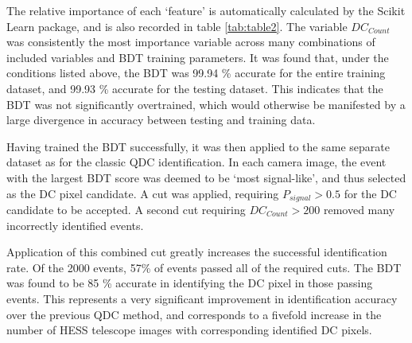 \documentclass[]{article}
\begin{document}
The relative importance of each \textquoteleft feature' is automatically calculated by the Scikit Learn package, and is also recorded in table \ref{tab:table2}. The variable $DC_{Count}$ was consistently the most importance variable across many combinations of included variables and BDT training parameters. It was found that, under the conditions listed above, the BDT was 99.94 \% accurate for the entire training dataset, and 99.93 \%  accurate for the testing dataset. This indicates that the BDT was not significantly overtrained, which would otherwise be manifested by a large divergence in accuracy between testing and training data.

Having trained the BDT successfully, it was then applied to the same separate dataset as for the classic QDC identification. In each camera image, the event with the largest BDT score was deemed to be \textquoteleft most signal-like', and thus selected as the DC pixel candidate. A cut was applied, requiring $P_{signal} > 0.5$ for the DC candidate to be accepted. A second cut requiring $DC_{Count} > 200$ removed many incorrectly identified events. 

Application of this combined cut greatly increases the successful identification rate. Of the 2000 events, 57\% of events passed all of the required cuts. The BDT was found to be 85 \% accurate in identifying the DC pixel in those passing events. This represents a very significant improvement in identification accuracy over the previous QDC method, and corresponds to a fivefold increase in the number of HESS telescope images with corresponding identified DC pixels.
\end{document}
